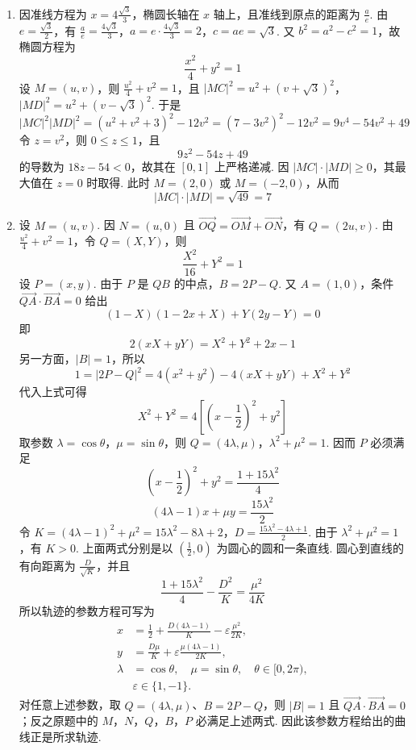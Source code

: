 \begin{problem}
\begin{solution}
\begin{enumerate}
\item 因准线方程为 \(x=4\frac{\sqrt{3}}{3}\)，椭圆长轴在 \(x\) 轴上，且准线到原点的距离为 \(\frac{a}{e}\). 由 \(e=\frac{\sqrt{3}}{2}\)，有
\(\frac{a}{e}=\frac{4\sqrt3}{3}\)，\(a=e\cdot\frac{4\sqrt3}{3}=2\)，\(c=ae=\sqrt3\).
又 \(b^2=a^2-c^2=1\)，故椭圆方程为
\[
\frac{x^2}{4}+y^2=1
\]
设 \(M=(u,v)\)，则 \(\frac{u^2}{4}+v^2=1\)，且
\(|MC|^2=u^2+(v+\sqrt3)^2\)，\(|MD|^2=u^2+(v-\sqrt3)^2\).
于是
\[
|MC|^2|MD|^2=(u^2+v^2+3)^2-12v^2
=(7-3v^2)^2-12v^2
=9v^4-54v^2+49
\]
令 \(z=v^2\)，则 \(0\leqslant z\leqslant1\)，且
\[
9z^2-54z+49
\]
的导数为 \(18z-54<0\)，故其在 \([0,1]\) 上严格递减. 因 \(|MC|\cdot|MD|\geqslant0\)，其最大值在 \(z=0\) 时取得. 此时 \(M=(2,0)\) 或 \(M=(-2,0)\)，从而
\[
|MC|\cdot|MD|=\sqrt{49}=7
\]
\item 设 \(M=(u,v)\). 因 \(N=(u,0)\) 且 \(\overrightarrow{OQ}=\overrightarrow{OM}+\overrightarrow{ON}\)，有 \(Q=(2u,v)\). 由 \(\frac{u^2}{4}+v^2=1\)，令 \(Q=(X,Y)\)，则
\[
\frac{X^2}{16}+Y^2=1
\]
设 \(P=(x,y)\). 由于 \(P\) 是 \(QB\) 的中点，\(B=2P-Q\). 又 \(A=(1,0)\)，条件 \(\overrightarrow{QA}\cdot\overrightarrow{BA}=0\) 给出
\[
(1-X)(1-2x+X)+Y(2y-Y)=0
\]
即
\[
2(xX+yY)=X^2+Y^2+2x-1
\]
另一方面，\(|B|=1\)，所以
\[
1=|2P-Q|^2=4(x^2+y^2)-4(xX+yY)+X^2+Y^2
\]
代入上式可得
\[
X^2+Y^2=4\left[\left(x-\frac12\right)^2+y^2\right]
\]
取参数 \(\lambda=\cos\theta\)，\(\mu=\sin\theta\)，则 \(Q=(4\lambda,\mu)\)，\(\lambda^2+\mu^2=1\). 因而 \(P\) 必须满足
\[
\left(x-\frac12\right)^2+y^2=\frac{1+15\lambda^2}{4}
\]
\[
(4\lambda-1)x+\mu y=\frac{15\lambda^2}{2}
\]
令
\(K=(4\lambda-1)^2+\mu^2=15\lambda^2-8\lambda+2\)，\(D=\frac{15\lambda^2-4\lambda+1}{2}\).
由于 \(\lambda^2+\mu^2=1\)，有 \(K>0\). 上面两式分别是以 \((\frac{1}{2},0)\) 为圆心的圆和一条直线. 圆心到直线的有向距离为 \(\frac{D}{\sqrt K}\)，并且
\[
\frac{1+15\lambda^2}{4}-\frac{D^2}{K}=\frac{\mu^2}{4K}
\]
所以轨迹的参数方程可写为
\[
\begin{aligned}
x&=\frac12+\frac{D(4\lambda-1)}{K}-\varepsilon\frac{\mu^2}{2K},\\
y&=\frac{D\mu}{K}+\varepsilon\frac{\mu(4\lambda-1)}{2K},\\
\lambda&=\cos\theta,\quad \mu=\sin\theta,\quad \theta\in[0,2\pi),\\
&\varepsilon\in\{1,-1\}.
\end{aligned}
\]
对任意上述参数，取 \(Q=(4\lambda,\mu)\)、\(B=2P-Q\)，则 \(|B|=1\) 且 \(\overrightarrow{QA}\cdot\overrightarrow{BA}=0\)；反之原题中的 \(M\)，\(N\)，\(Q\)，\(B\)，\(P\) 必满足上述两式. 因此该参数方程给出的曲线正是所求轨迹.
\end{enumerate}
\end{solution}
\end{problem}

